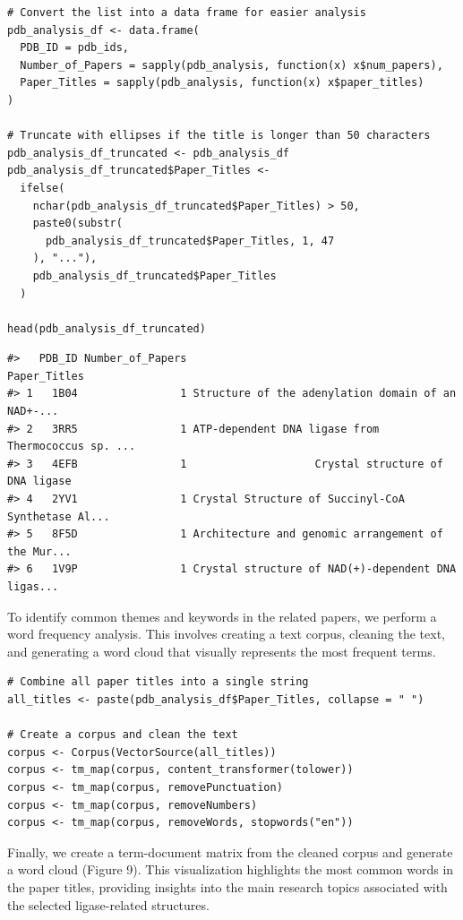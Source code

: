 \begin{verbatim}
# Convert the list into a data frame for easier analysis
pdb_analysis_df <- data.frame(
  PDB_ID = pdb_ids,
  Number_of_Papers = sapply(pdb_analysis, function(x) x$num_papers),
  Paper_Titles = sapply(pdb_analysis, function(x) x$paper_titles)
)

# Truncate with ellipses if the title is longer than 50 characters
pdb_analysis_df_truncated <- pdb_analysis_df
pdb_analysis_df_truncated$Paper_Titles <-
  ifelse(
    nchar(pdb_analysis_df_truncated$Paper_Titles) > 50,
    paste0(substr(
      pdb_analysis_df_truncated$Paper_Titles, 1, 47
    ), "..."),
    pdb_analysis_df_truncated$Paper_Titles
  )

head(pdb_analysis_df_truncated)  
\end{verbatim}

\begin{verbatim}
#>   PDB_ID Number_of_Papers                                       Paper_Titles
#> 1   1B04                1 Structure of the adenylation domain of an NAD+-...
#> 2   3RR5                1 ATP-dependent DNA ligase from Thermococcus sp. ...
#> 3   4EFB                1                    Crystal structure of DNA ligase
#> 4   2YV1                1 Crystal Structure of Succinyl-CoA Synthetase Al...
#> 5   8F5D                1 Architecture and genomic arrangement of the Mur...
#> 6   1V9P                1 Crystal structure of NAD(+)-dependent DNA ligas...
\end{verbatim}

To identify common themes and keywords in the related papers, we perform a word frequency analysis. This involves creating a text corpus, cleaning the text, and generating a word cloud that visually represents the most frequent terms.

\begin{verbatim}
# Combine all paper titles into a single string
all_titles <- paste(pdb_analysis_df$Paper_Titles, collapse = " ")

# Create a corpus and clean the text
corpus <- Corpus(VectorSource(all_titles))
corpus <- tm_map(corpus, content_transformer(tolower))
corpus <- tm_map(corpus, removePunctuation)
corpus <- tm_map(corpus, removeNumbers)
corpus <- tm_map(corpus, removeWords, stopwords("en"))
\end{verbatim}

Finally, we create a term-document matrix from the cleaned corpus and generate a word cloud (Figure 9). This visualization highlights the most common words in the paper titles, providing insights into the main research topics associated with the selected ligase-related structures.

